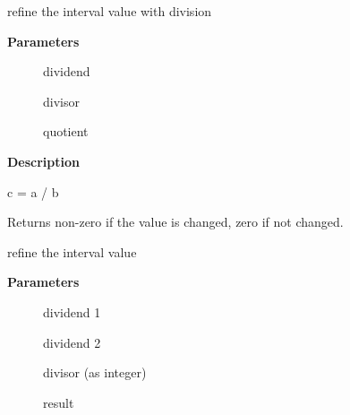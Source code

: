 \documentclass[a4paper,8pt,english]{sphinxmanual}
\begin{document}
\begin{fulllineitems}
\label{sound/kernel-api/alsa-driver-api:c.snd_interval_div}
refine the interval value with division

\end{fulllineitems}


\textbf{Parameters}
\begin{description}
\item[{}] \leavevmode
dividend

\item[{}] \leavevmode
divisor

\item[{}] \leavevmode
quotient

\end{description}

\textbf{Description}

c = a / b

Returns non-zero if the value is changed, zero if not changed.

\begin{fulllineitems}
\label{sound/kernel-api/alsa-driver-api:c.snd_interval_muldivk}
refine the interval value

\end{fulllineitems}


\textbf{Parameters}
\begin{description}
\item[{}] \leavevmode
dividend 1

\item[{}] \leavevmode
dividend 2

\item[{}] \leavevmode
divisor (as integer)

\item[{}] \leavevmode
result

\end{description}
\end{document}
